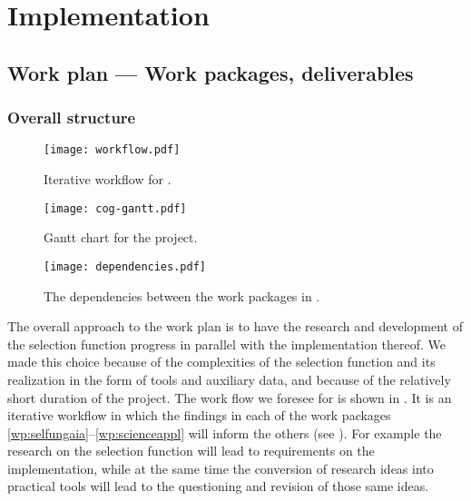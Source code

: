 \chapter{Implementation}
\label{cha:implementation}

\section{Work plan --- Work packages, deliverables}
\label{sec:work-plan}

\subsection{Overall structure}
\label{sec:wpstructure}

\begin{figure}
    \centering
    \texttt{[image: workflow.pdf]}
    \caption{Iterative workflow for {\acro}.}
    \label{fig:workflow}
\end{figure}

\begin{figure}
    \centering
    \texttt{[image: cog-gantt.pdf]}
    \caption{Gantt chart for the {\acro} project.}
    \label{fig:gantt}
\end{figure}

\begin{figure}
    \centering
    \texttt{[image: dependencies.pdf]}
    \caption{The dependencies between the work packages in \acro.}
    \label{fig:dependencies}
\end{figure}

The overall approach to the work plan is to have the research and development of the selection function progress in parallel with the implementation thereof. We made this choice because of the complexities of the selection function and its realization in the form of tools and auxiliary data, and because of the relatively short duration of the project. The work flow we foresee for {\acro} is shown in . It is an iterative workflow in which the findings in each of the work packages \ref{wp:selfungaia}--\ref{wp:scienceappl} will inform the others (see ). For example the research on the selection function will lead to requirements on the implementation, while at the same time the conversion of research ideas into practical tools will lead to the questioning and revision of those same ideas.

